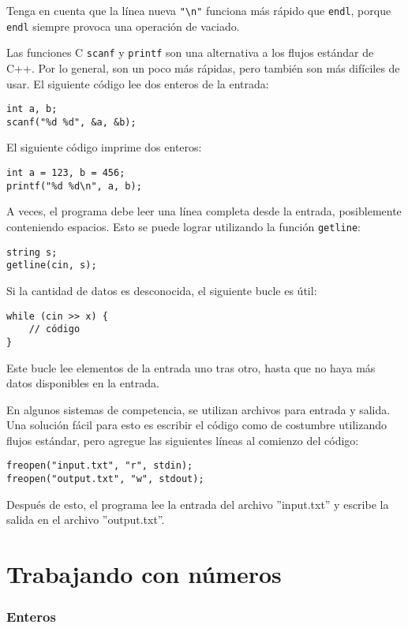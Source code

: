Tenga en cuenta que la línea nueva \texttt{"\textbackslash n"}
funciona más rápido que \texttt{endl},
porque \texttt{endl} siempre provoca
una operación de vaciado.

Las funciones C \texttt{scanf}
y \texttt{printf} son una alternativa
a los flujos estándar de C++.
Por lo general, son un poco más rápidas,
pero también son más difíciles de usar.
El siguiente código lee dos enteros de la entrada:
\begin{lstlisting}
int a, b;
scanf("%d %d", &a, &b);
\end{lstlisting}
El siguiente código imprime dos enteros:
\begin{lstlisting}
int a = 123, b = 456;
printf("%d %d\n", a, b);
\end{lstlisting}
A veces, el programa debe leer una línea completa
desde la entrada, posiblemente conteniendo espacios.
Esto se puede lograr utilizando la
función \texttt{getline}:

\begin{lstlisting}
string s;
getline(cin, s);
\end{lstlisting}

Si la cantidad de datos es desconocida, el siguiente
bucle es útil:
\begin{lstlisting}
while (cin >> x) {
    // código
}
\end{lstlisting}
Este bucle lee elementos de la entrada
uno tras otro, hasta que no haya
más datos disponibles en la entrada.

En algunos sistemas de competencia, se utilizan archivos para
entrada y salida.
Una solución fácil para esto es escribir
el código como de costumbre utilizando flujos estándar,
pero agregue las siguientes líneas al comienzo del código:
\begin{lstlisting}
freopen("input.txt", "r", stdin);
freopen("output.txt", "w", stdout);
\end{lstlisting}
Después de esto, el programa lee la entrada del archivo
''input.txt'' y escribe la salida en el archivo
''output.txt''.

\section{Trabajando con números}


\subsubsection{Enteros}

